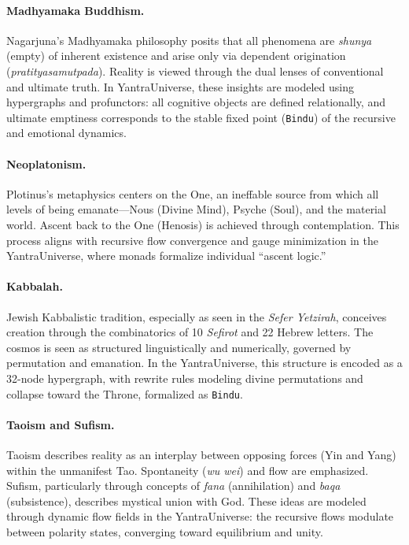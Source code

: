 \documentclass[12pt]{article}
\theoremstyle{plain}
\begin{document}
\paragraph{Madhyamaka Buddhism.}
Nagarjuna’s Madhyamaka philosophy posits that all phenomena are \textit{shunya} (empty) of inherent existence and arise only via dependent origination (\textit{pratityasamutpada}). Reality is viewed through the dual lenses of conventional and ultimate truth. In YantraUniverse, these insights are modeled using hypergraphs and profunctors: all cognitive objects are defined relationally, and ultimate emptiness corresponds to the stable fixed point (\texttt{Bindu}) of the recursive and emotional dynamics.

\paragraph{Neoplatonism.}
Plotinus’s metaphysics centers on the One, an ineffable source from which all levels of being emanate—Nous (Divine Mind), Psyche (Soul), and the material world. Ascent back to the One (Henosis) is achieved through contemplation. This process aligns with recursive flow convergence and gauge minimization in the YantraUniverse, where monads formalize individual “ascent logic.”

\paragraph{Kabbalah.}
Jewish Kabbalistic tradition, especially as seen in the \textit{Sefer Yetzirah}, conceives creation through the combinatorics of 10 \textit{Sefirot} and 22 Hebrew letters. The cosmos is seen as structured linguistically and numerically, governed by permutation and emanation. In the YantraUniverse, this structure is encoded as a 32-node hypergraph, with rewrite rules modeling divine permutations and collapse toward the Throne, formalized as \texttt{Bindu}.

\paragraph{Taoism and Sufism.}
Taoism describes reality as an interplay between opposing forces (Yin and Yang) within the unmanifest Tao. Spontaneity (\textit{wu wei}) and flow are emphasized. Sufism, particularly through concepts of \textit{fana} (annihilation) and \textit{baqa} (subsistence), describes mystical union with God. These ideas are modeled through dynamic flow fields in the YantraUniverse: the recursive flows modulate between polarity states, converging toward equilibrium and unity.
\end{document}
